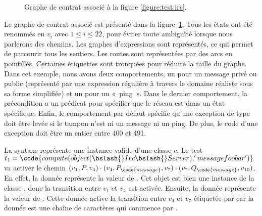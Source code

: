 %
\begin{figure}


\caption{\label{figure:test:irc_graph} Graphe de contrat associé à la figure
\ref{figure:test:irc}.}

\end{figure}
%
Le graphe de contrat associé est présenté dans la
figure~\ref{figure:test:irc_graph}. Tous les états ont été renommés en $v_i$
avec $1 \leq i \leq 22$, pour éviter toute ambiguïté lorsque nous parlerons des
chemins. Les graphes d'expressions sont représentés, ce qui permet de parcourir
tous les sentiers. Les routes sont représentées par des arcs en
pointillés. Certaines étiquettes sont tronquées pour réduire la taille du
graphe. Dans cet exemple, nous avons deux comportements, un pour un message
privé ou public (représenté par une expression régulière à travers le domaine
réaliste  sous sa forme simplifiée) et un pour un «~ping~». Dans le
dernier comportement, la précondition a un prédicat pour spécifier que le réseau
est dans un état spécifique. Enfin, le comportement par défaut spécifie qu'une
exception de type 
doit être levée si le tampon n'est ni un message ni un ping. De plus, le code
d'une exception doit être un entier entre 400 et 491.

\begin{example}

La syntaxe  représente une instance valide d'une classe $c$.
Le test $t_1 = \code{compute(object(\bslash{}Irc\bslash{}Server), 'message
foobar')}$ va activer le chemin $(v_1, P, v_4) \cdot (v_4, P_\code{message},
v_7) \cdot (v_7, Q_\code{message}, v_{10})$. En effet, la donnée
 représente la valeur de
. Cet objet est bien une instance de la classe
, donc la transition entre $v_1$ et $v_4$ est
activée. Ensuite, la donnée  représente la valeur de
. Cette donnée active la transition entre $v_4$ et $v_7$
étiquetée par 
car la donnée est une chaîne de caractères qui commence par .

\end{example}
